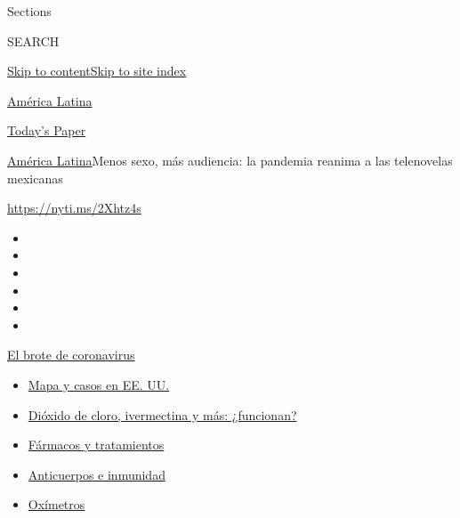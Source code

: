 Sections

SEARCH

\protect\hyperlink{site-content}{Skip to
content}\protect\hyperlink{site-index}{Skip to site index}

\href{https://www.nytimes.com/es/section/america-latina}{América Latina}

\href{https://myaccount.nytimes.com/auth/login?response_type=cookie\&client_id=vi}{}

\href{https://www.nytimes.com/section/todayspaper}{Today's Paper}

\href{/es/section/america-latina}{América Latina}\textbar{}Menos sexo,
más audiencia: la pandemia reanima a las telenovelas mexicanas

\url{https://nyti.ms/2Xhtz4s}

\begin{itemize}
\item
\item
\item
\item
\item
\item
\end{itemize}

\href{https://www.nytimes.com/es/spotlight/coronavirus?action=click\&pgtype=Article\&state=default\&region=TOP_BANNER\&context=storylines_menu}{El
brote de coronavirus}

\begin{itemize}
\tightlist
\item
  \href{https://www.nytimes.com/es/interactive/2020/espanol/mundo/coronavirus-en-estados-unidos.html?action=click\&pgtype=Article\&state=default\&region=TOP_BANNER\&context=storylines_menu}{Mapa
  y casos en EE. UU.}
\item
  \href{https://www.nytimes.com/es/2020/07/23/espanol/america-latina/bolivia-cloro-coronavirus-ivermectina.html?action=click\&pgtype=Article\&state=default\&region=TOP_BANNER\&context=storylines_menu}{Dióxido
  de cloro, ivermectina y más: ¿funcionan?}
\item
  \href{https://www.nytimes.com/es/interactive/2020/science/coronavirus-tratamientos-curas.html?action=click\&pgtype=Article\&state=default\&region=TOP_BANNER\&context=storylines_menu}{Fármacos
  y tratamientos}
\item
  \href{https://www.nytimes.com/es/2020/07/28/espanol/ciencia-y-tecnologia/anticuerpos-coronavirus-inmunidad.html?action=click\&pgtype=Article\&state=default\&region=TOP_BANNER\&context=storylines_menu}{Anticuerpos
  e inmunidad}
\item
  \href{https://www.nytimes.com/es/2020/04/29/espanol/estilos-de-vida/oximetro-para-que-sirve.html?action=click\&pgtype=Article\&state=default\&region=TOP_BANNER\&context=storylines_menu}{Oxímetros}
\end{itemize}

